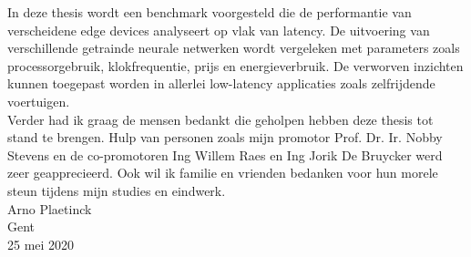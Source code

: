 In deze thesis wordt een benchmark voorgesteld die de performantie van verscheidene edge devices analyseert op vlak van latency. De uitvoering van verschillende getrainde neurale netwerken wordt vergeleken met parameters zoals processorgebruik, klokfrequentie, prijs en energieverbruik. De verworven inzichten kunnen toegepast worden in allerlei low-latency applicaties zoals zelfrijdende voertuigen.\\
Verder had ik graag de mensen bedankt die geholpen hebben deze thesis tot stand te brengen. Hulp van personen zoals mijn promotor Prof. Dr. Ir. Nobby Stevens en de co-promotoren Ing Willem Raes en Ing Jorik De Bruycker werd zeer geapprecieerd. Ook wil ik familie en vrienden bedanken voor hun morele steun tijdens mijn studies en eindwerk.\\

Arno Plaetinck\\
Gent\\
25 mei 2020
